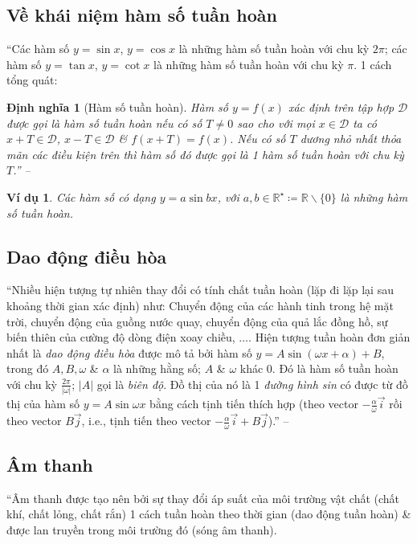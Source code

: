 \documentclass[oneside]{book}
\numberwithin{equation}{section}
\newtheorem{dinhnghia}{Định nghĩa}[section]
\newtheorem{vidu}{Ví dụ}[section]
\begin{document}
\subsection{Về khái niệm hàm số tuần hoàn}
``Các hàm số $y = \sin x$, $y = \cos x$ là những hàm số tuần hoàn với chu kỳ $2\pi$; các hàm số $y = \tan x$, $y = \cot x$ là những hàm số tuần hoàn với chu kỳ $\pi$. 1 cách tổng quát:

\begin{dinhnghia}[Hàm số tuần hoàn]
	Hàm số $y = f(x)$ xác định trên tập hợp $\mathcal{D}$ được gọi là \emph{hàm số tuần hoàn} nếu có số $T\ne 0$ sao cho với mọi $x\in\mathcal{D}$ ta có $x + T\in\mathcal{D}$, $x - T\in\mathcal{D}$ \& $f(x + T) = f(x)$. Nếu có số $T$ dương nhỏ nhất thỏa mãn các điều kiện trên thì hàm số đó được gọi là 1 \emph{hàm số tuần hoàn với chu kỳ $T$}.'' -- \cite[p. 13]{SGK_Toan_11_dai_so_giai_tich_nang_cao}
\end{dinhnghia}

\begin{vidu}
	Các hàm số có dạng $y = a\sin bx$, với $a,b\in\mathbb{R}^\star\coloneqq\mathbb{R}\backslash\{0\}$ là những hàm số tuần hoàn.
\end{vidu}

\subsection{Dao động điều hòa}
``Nhiều hiện tượng tự nhiên thay đổi có tính chất tuần hoàn (lặp đi lặp lại sau khoảng thời gian xác định) như: Chuyển động của các hành tinh trong hệ mặt trời, chuyển động của guồng nước quay, chuyển động của quả lắc đồng hồ, sự biến thiên của cường độ dòng điện xoay chiều, $\ldots$. Hiện tượng tuần hoàn đơn giản nhất là \textit{dao động điều hòa} được mô tả bởi hàm số $y = A\sin(\omega x + \alpha) + B$, trong đó $A,B,\omega$ \& $\alpha$ là những hằng số; $A$ \& $\omega$ khác $0$. Đó là hàm số tuần hoàn với chu kỳ $\frac{2\pi}{|\omega|}$; $|A|$ gọi là \textit{biên độ}. Đồ thị của nó là 1 \textit{đường hình sin} có được từ đồ thị của hàm số $y = A\sin\omega x$ bằng cách tịnh tiến thích hợp (theo vector $-\frac{\alpha}{\omega}\vec{i}$ rồi theo vector $B\vec{j}$, i.e., tịnh tiến theo vector $-\frac{\alpha}{\omega}\vec{i} + B\vec{j}$).'' -- \cite[pp. 15--16]{SGK_Toan_11_dai_so_giai_tich_nang_cao}

\subsection{Âm thanh}
``Âm thanh được tạo nên bởi sự thay đổi áp suất của môi trường vật chất (chất khí, chất lỏng, chất rắn) 1 cách tuần hoàn theo thời gian (dao động tuần hoàn) \& được lan truyền trong môi trường đó (sóng âm thanh).
\end{document}
